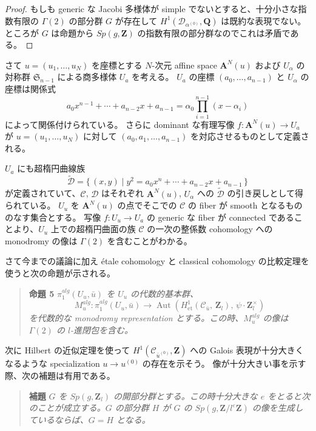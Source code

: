 \documentclass[uplatex,dvipdfmx]{jlreq}
\def\Aut{\operatorname{Aut}}
\begin{document}
\begin{proof}
もしも generic な Jacobi 多様体が simple でないとすると、十分小さな指数有限の $\Gamma(2)$ の部分群 $G$ が存在して $H^1(\mathcal{D}_{\alpha^{(0)}}, \mathbf{Q})$ は既約な表現でない。
ところが $G$ は命題から $Sp(g, \mathbf{Z})$ の指数有限の部分群なのでこれは矛盾である。
\end{proof}

さて $u = (u_1, \dots, u_N)$ を座標とする $N$-次元 affine space $\mathbf{A}^N(u)$ および $U_{\alpha}$ の対称群 $\mathfrak{S}_{n-1}$ による商多様体 $U_a$ を考える。
$U_a$ の座標 $(a_0, \dots, a_{n-1})$ と $U_{\alpha}$ の座標は関係式
\[
  a_0 x^{n-1} + \cdots + a_{n-2} x + a_{n-1} = \alpha_0 \prod_{i=1}^{n-1}(x - \alpha_i)
\]
によって関係付けられている。
さらに dominant な有理写像 $f : \mathbf{A}^N(u) \to U_a$ が $u = (u_1, \dots, u_N)$ に対して $(a_0, a_1, \dots, a_{n-1})$ を対応させるものとして定義される。

$U_a$ にも超楕円曲線族
\[
  \tilde{\mathcal{D}} = \{\, (x, y) \mid y^2 = a_0 x^n + \cdots + a_{n-2} x + a_{n-1} \,\}
\]
が定義されていて、$\mathcal{C}$, $\mathcal{D}$ はそれぞれ $\mathbf{A}^N(u)$, $U_{\alpha}$ への $\tilde{\mathcal{D}}$ の引き戻しとして得られている。
$U_u$ を $\mathbf{A}^N(u)$ の点でそこでの $\mathcal{C}$ の fiber が smooth となるもののなす集合とする。
写像 $f : U_u \to U_a$ の generic な fiber が connected であることより、$U_u$ 上での超楕円曲面の族 $\mathcal{C}$ の一次の整係数 cohomology への monodromy の像は $\Gamma(2)$ を含むことがわかる。

さて今までの議論に加え étale cohomology と classical cohomology の比較定理を使うと次の命題が示される。

\begin{quote}
\textbf{命題 5}\quad
\textit{$\pi_1^{alg}(U_u, \bar{u})$ を $U_u$ の代数的基本群、
\[
  M_{u}^{alg} : \pi_1^{alg}(U_u, \bar{u}) \to \Aut(H^1_{\mathrm{et}}(\mathcal{C}_{\bar{u}},\, \mathbf{Z}_l),\, \psi \cdot \mathbf{Z}_l^{\times})
\]
を代数的な monodromy representation とする。この時、$M_u^{alg}$ の像は $\Gamma(2)$ の $l$-進閉包を含む。}
\end{quote}

次に Hilbert の近似定理を使って $H^1(\mathcal{C}_{\bar{u}^{(0)}}, \mathbf{Z})$ への Galois 表現が十分大きくなるような specialization $u \to u^{(0)}$ の存在を示そう。
像が十分大きい事を示す際、次の補題は有用である。

\begin{quote}
\textbf{補題}\quad
\textit{$G$ を $Sp(g, \mathbf{Z}_l)$ の開部分群とする。この時十分大きな $e$ をとると次のことが成立する。$G$ の部分群 $H$ が $G$ の $Sp(g, \mathbf{Z}/l^e\mathbf{Z})$ の像を生成しているならば、$G = H$ となる。}
\end{quote}
\end{document}
